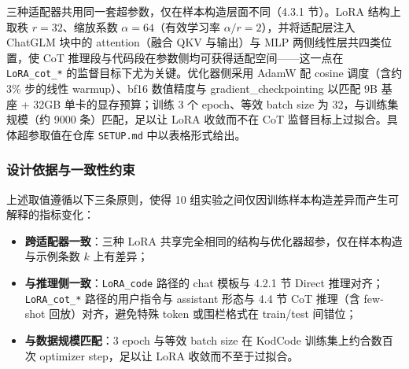 
三种适配器共用同一套超参数，仅在样本构造层面不同（4.3.1 节）。LoRA 结构上取秩 $r=32$、缩放系数 $\alpha=64$（有效学习率 $\alpha/r=2$），并将适配层注入 ChatGLM 块中的 attention（融合 QKV 与输出）与 MLP 两侧线性层共四类位置，使 CoT 推理段与代码段在参数侧均可获得适配空间——这一点在 \texttt{LoRA\_cot\_*} 的监督目标下尤为关键。优化器侧采用 AdamW 配 cosine 调度（含约 3\% 步的线性 warmup）、bf16 数值精度与 gradient\_checkpointing 以匹配 9B 基座 + 32GB 单卡的显存预算；训练 3 个 epoch、等效 batch size 为 32，与训练集规模（约 9000 条）匹配，足以让 LoRA 收敛而不在 CoT 监督目标上过拟合。具体超参取值在仓库 \texttt{SETUP.md} 中以表格形式给出。

\subsubsection{设计依据与一致性约束}
上述取值遵循以下三条原则，使得 10 组实验之间仅因训练样本构造差异而产生可解释的指标变化：
\begin{itemize}
    \item \textbf{跨适配器一致}：三种 LoRA 共享完全相同的结构与优化器超参，仅在样本构造与示例条数 $k$ 上有差异；
    \item \textbf{与推理侧一致}：\texttt{LoRA\_code} 路径的 chat 模板与 4.2.1 节 Direct 推理对齐；\texttt{LoRA\_cot\_*} 路径的用户指令与 assistant 形态与 4.4 节 CoT 推理（含 few-shot 回放）对齐，避免特殊 token 或围栏格式在 train/test 间错位；
    \item \textbf{与数据规模匹配}：3 epoch 与等效 batch size 在 KodCode 训练集上约合数百次 optimizer step，足以让 LoRA 收敛而不至于过拟合。
\end{itemize}
